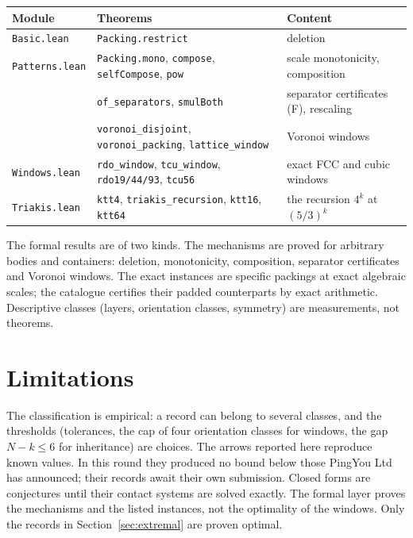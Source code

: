 \documentclass[11pt,a4paper]{article}
\newcommand{\code}[1]{\texttt{\nolinkurl{#1}}}
\newcommand{\lean}[1]{\texttt{#1}}
\theoremstyle{definition}
\theoremstyle{remark}
\begin{document}
\begin{center}\small
\begin{tabularx}{\textwidth}{l >{\raggedright}X >{\raggedright\arraybackslash}p{4.2cm}}
\toprule
Module & Theorems & Content \\
\midrule
\code{Basic.lean} & \lean{Packing.restrict} & deletion \\
\code{Patterns.lean} & \lean{Packing.mono}, \lean{compose}, \lean{selfCompose}, \lean{pow} & scale monotonicity, composition \\
 & \lean{of\_separators}, \lean{smulBoth} & separator certificates (F), rescaling \\
 & \lean{voronoi\_disjoint}, \lean{voronoi\_packing}, \lean{lattice\_window} & Voronoi windows \\
\code{Windows.lean} & \lean{rdo\_window}, \lean{tcu\_window}, \lean{rdo19/44/93}, \lean{tcu56} & exact FCC and cubic windows \\
\code{Triakis.lean} & \lean{ktt4}, \lean{triakis\_recursion}, \lean{ktt16}, \lean{ktt64} & the recursion $4^k$ at $(5/3)^k$ \\
\bottomrule
\end{tabularx}
\end{center}

The formal results are of two kinds. The mechanisms are proved for arbitrary bodies and containers: deletion, monotonicity, composition, separator certificates and Voronoi windows. The exact instances are specific packings at exact algebraic scales; the catalogue certifies their padded counterparts by exact arithmetic. Descriptive classes (layers, orientation classes, symmetry) are measurements, not theorems.

\section{Limitations}\label{sec:limits}

The classification is empirical: a record can belong to several classes, and the thresholds (tolerances, the cap of four orientation classes for windows, the gap $N-k\le6$ for inheritance) are choices. The arrows reported here reproduce known values. In this round they produced no bound below those PingYou Ltd has announced; their records await their own submission. Closed forms are conjectures until their contact systems are solved exactly. The formal layer proves the mechanisms and the listed instances, not the optimality of the windows. Only the records in Section~\ref{sec:extremal} are proven optimal.
\end{document}
